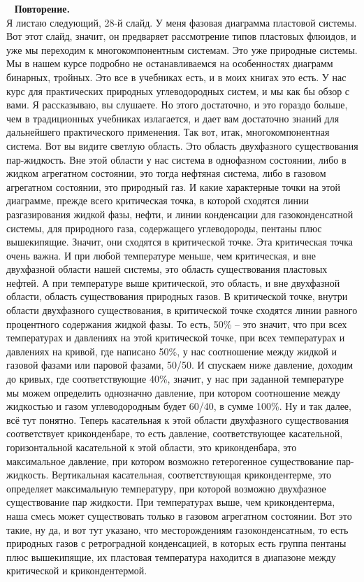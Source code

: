 \documentclass[main.tex]{subfiles}
\begin{document}
\ \newline
\textbf{Повторение.}\\
Я листаю следующий, 28-й слайд.
У меня фазовая диаграмма пластовой системы.
Вот этот слайд, значит, он предваряет рассмотрение типов пластовых флюидов, и уже мы переходим к многокомпонентным системам.
Это уже природные системы.
Мы в нашем курсе подробно не останавливаемся на особенностях диаграмм бинарных, тройных.
Это все в учебниках есть, и в моих книгах это есть.
У нас курс для практических природных углеводородных систем, и мы как бы обзор с вами.
Я рассказываю, вы слушаете.
Но этого достаточно, и это гораздо больше, чем в традиционных учебниках излагается, и дает вам достаточно знаний для дальнейшего практического применения.
Так вот, итак, многокомпонентная система.
Вот вы видите светлую область.
Это область двухфазного существования пар-жидкость.
Вне этой области у нас система в однофазном состоянии, либо в жидком агрегатном состоянии, это тогда нефтяная система, либо в газовом агрегатном состоянии, это природный газ.
И какие характерные точки на этой диаграмме, прежде всего критическая точка, в которой сходятся линии разгазирования жидкой фазы, нефти, и линии конденсации для газоконденсатной системы, для природного газа, содержащего углеводороды, пентаны плюс вышекипящие.
Значит, они сходятся в критической точке.
Эта критическая точка очень важна.
И при любой температуре меньше, чем критическая, и вне двухфазной области нашей системы, это область существования пластовых нефтей.
А при температуре выше критической, это область, и вне двухфазной области, область существования природных газов.
В критической точке, внутри области двухфазного существования, в критической точке сходятся линии равного процентного содержания жидкой фазы.
То есть, 50\% -- это значит, что при всех температурах и давлениях на этой критической точке, при всех температурах и давлениях на кривой, где написано 50\%, у нас соотношение между жидкой и газовой фазами или паровой фазами, 50/50.
И спускаем ниже давление, доходим до кривых, где соответствующие 40\%, значит, у нас при заданной температуре мы можем определить однозначно давление, при котором соотношение между жидкостью и газом углеводородным будет 60/40, в сумме 100\%.
Ну и так далее, всё тут понятно.
Теперь касательная к этой области двухфазного существования соответствует криконденбаре, то есть давление, соответствующее касательной, горизонтальной касательной к этой области, это криконденбара, это максимальное давление, при котором возможно гетерогенное существование пар-жидкость.
Вертикальная касательная, соответствующая крикондентерме, это определяет максимальную температуру, при которой возможно двухфазное существование пар жидкости.
При температурах выше, чем крикондентерма, наша смесь может существовать только в газовом агрегатном состоянии.
Вот это такие, ну да, и вот тут указано, что месторождениям газоконденсатным, то есть природных газов с ретроградной конденсацией, в которых есть группа пентаны плюс вышекипящие, их пластовая температура находится в диапазоне между критической и крикондентермой.
\end{document}

